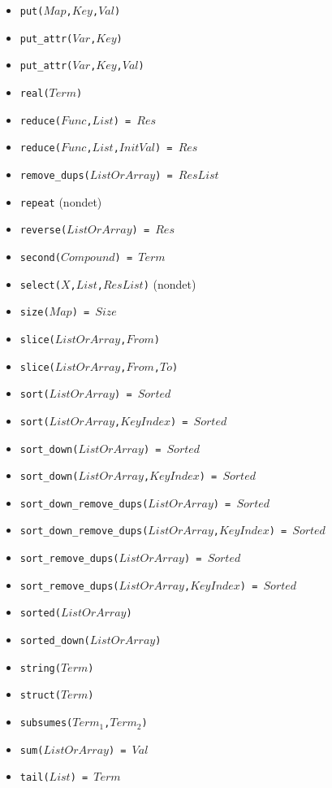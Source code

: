 \documentclass[10pt]{article}
\begin{document}
\begin{multicols}{2}
\begin{scriptsize}
\begin{itemize}
    \item \texttt{put($Map$,$Key$,$Val$)} 
    \item \texttt{put\_attr($Var$,$Key$)} 
    \item \texttt{put\_attr($Var$,$Key$,$Val$)} 
    \item \texttt{real($Term$)} 
    \item \texttt{reduce($Func$,$List$) = $Res$} 
    \item \texttt{reduce($Func$,$List$,$InitVal$) = $Res$} 
    \item \texttt{remove\_dups($ListOrArray$) = $ResList$} 
    \item \texttt{repeat} (nondet)
    \item \texttt{reverse($ListOrArray$) = $Res$} 
    \item \texttt{second($Compound$) = $Term$} 
    \item \texttt{select($X$,$List$,$ResList$)} (nondet)
    \item \texttt{size($Map$) = $Size$}
    \item \texttt{slice($ListOrArray$,$From$)}
    \item \texttt{slice($ListOrArray$,$From$,$To$)}
    \item \texttt{sort($ListOrArray$) = $Sorted$} 
    \item \texttt{sort($ListOrArray$,$KeyIndex$) = $Sorted$} 
    \item \texttt{sort\_down($ListOrArray$) = $Sorted$} 
    \item \texttt{sort\_down($ListOrArray$,$KeyIndex$) = $Sorted$} 
    \item \texttt{sort\_down\_remove\_dups($ListOrArray$) = $Sorted$} 
    \item \texttt{sort\_down\_remove\_dups($ListOrArray$,$KeyIndex$) = $Sorted$} 
    \item \texttt{sort\_remove\_dups($ListOrArray$) = $Sorted$} 
    \item \texttt{sort\_remove\_dups($ListOrArray$,$KeyIndex$) = $Sorted$} 
    \item \texttt{sorted($ListOrArray$)} 
    \item \texttt{sorted\_down($ListOrArray$)} 
    \item \texttt{string($Term$)} 
    \item \texttt{struct($Term$)} 
    \item \texttt{subsumes($Term_1$,$Term_2$)}
    \item \texttt{sum($ListOrArray$) = $Val$}
    \item \texttt{tail($List$) = $Term$} 

\end{itemize}
\end{scriptsize}
\end{multicols}
\end{document}
